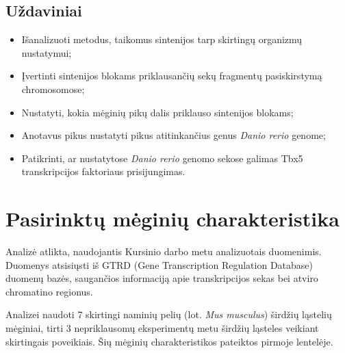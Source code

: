 \documentclass[12pt]{article}
\begin{document}
\subsection*{Uždaviniai}
\begin{itemize}
    \item Išanalizuoti metodus, taikomus sintenijos tarp skirtingų organizmų
          nustatymui;
    \item Įvertinti sintenijos blokams priklausančių sekų fragmentų
          pasiskirstymą chromosomose;
    \item Nustatyti, kokia mėginių pikų dalis priklauso sintenijos blokams;
    \item Anotavus pikus nustatyti pikus atitinkančius genus \emph{Danio rerio}
          genome;
    \item Patikrinti, ar nustatytose \emph{Danio rerio} genomo sekose galimas
          Tbx5 transkripcijos faktoriaus prisijungimas.
\end{itemize}

\newpage


\section{Pasirinktų mėginių charakteristika}
Analizė atlikta, naudojantis Kursinio darbo metu analizuotais duomenimis.
Duomenys atsisiųsti iš GTRD (Gene Transcription Regulation Database)\cite{GTRD}
duomenų bazės, saugančios informaciją apie transkripcijos sekas bei atviro
chromatino regionus.

Analizei naudoti 7 skirtingi naminių pelių (lot. \emph{Mus musculus}) širdžių
ląstelių mėginiai, tirti 3 nepriklausomų eksperimentų metu širdžių ląsteles
veikiant skirtingais poveikiais. Šių mėginių charakteristikos pateiktos pirmoje
lentelėje.
\end{document}
